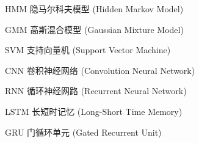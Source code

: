 \begin{denotation}[3cm]
\item [HMM] 隐马尔科夫模型 (Hidden Markov Model)
\item [GMM] 高斯混合模型  (Gaussian Mixture Model)
\item [SVM] 支持向量机 (Support Vector Machine)
\item[CNN] 卷积神经网络 (Convolution Neural Network)
\item[RNN] 循环神经网路 (Recurrent Neural Network)
\item[LSTM] 长短时记忆 (Long-Short Time Memory)
\item[GRU] 门循环单元 (Gated Recurrent Unit)
\end{denotation}
